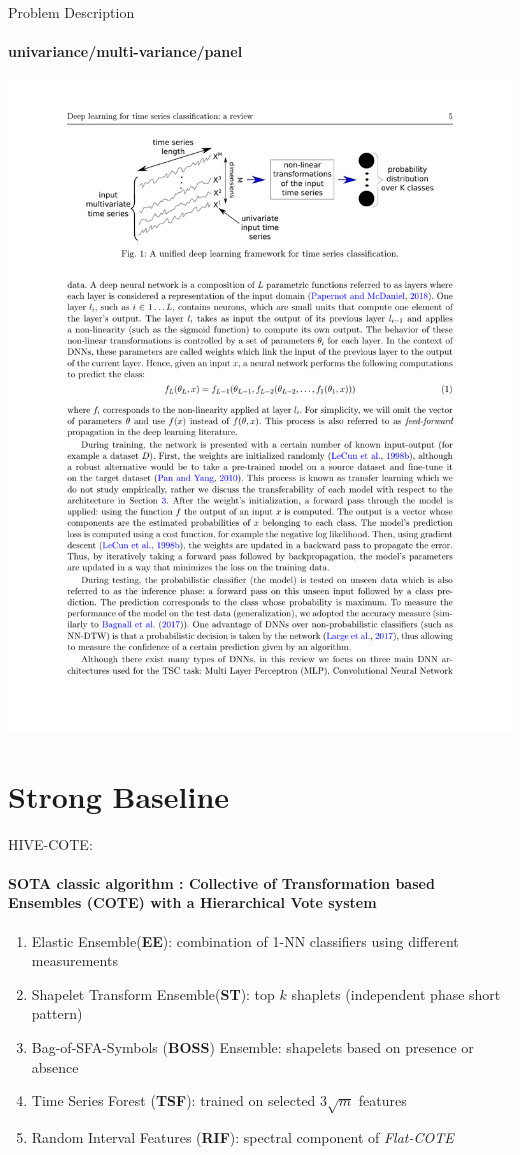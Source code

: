\documentclass{ctexbeamer}
\begin{document}
\begin{frame}{Problem Description}
	\framesubtitle{univariance/multi-variance/panel}
	\begin{center}
		\includegraphics[width=\textwidth]{figure/base_formula}
	\end{center}
\end{frame}

\section{Strong Baseline}
\begin{frame}{HIVE-COTE:}
	\framesubtitle{\textbf{SOTA} classic algorithm : Collective of Transformation based \textbf{Ensembles} (COTE) with a Hierarchical Vote system}
	\begin{enumerate}
		\item Elastic Ensemble(\textbf{EE}): combination of 1-NN classifiers using different measurements
		\item Shapelet Transform Ensemble(\textbf{ST}): top $k$ shaplets (independent phase short pattern)
		\item Bag-of-SFA-Symbols (\textbf{BOSS}) Ensemble: shapelets based on presence or absence
		\item Time Series Forest (\textbf{TSF}): trained on selected $3 \sqrt{m}$ features
		\item Random Interval Features (\textbf{RIF}): spectral component of \textit{Flat-COTE}
	\end{enumerate}
\end{frame}
\end{document}
